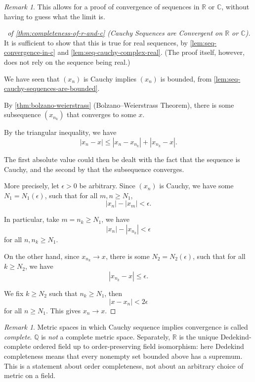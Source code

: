 \documentclass[11pt]{article}
\numberwithin{equation}{section}
\theoremstyle{definition}
\theoremstyle{remark}
\newtheorem{remark}[theorem]{Remark}
\newcommand{\pqty}[1]{\left(#1\right)}
\newcommand{\abs}[1]{\left|#1\right|}
\newcommand{\RR}{\mathbb R}
\newcommand{\CC}{\mathbb C}
\newcommand{\QQ}{\mathbb Q}
\begin{document}
\begin{remark}\label{analysis-unit-0028}
    This allows for a proof of convergence of sequences in \(\RR\) or \(\CC\), without having to guess what the limit is.
\end{remark}

\begin{proof}[\proofname\ of \autoref{thm:completeness-of-r-and-c} (Cauchy Sequences are Convergent on \(\RR\) or \(\CC\))]
    It is sufficient to show that this is true for real sequences, by \autoref{lem:seq-convergence-in-c} and \autoref{lem:seq-cauchy-complex-real}. (The proof itself, however, does not rely on the sequence being real.)

    We have seen that \(\pqty{x_n}\) is Cauchy implies \(\pqty{x_n}\) is bounded, from \autoref{lem:seq-cauchy-sequences-are-bounded}.
    
    By \autoref{thm:bolzano-weierstrass} (Bolzano--Weierstrass Theorem), there is some subsequence \(\pqty{x_{n_k}}\) that converges to some \(x\).

    By the triangular inequality, we have
    \[
        \abs{x_n - x} \leq \abs{x_n - x_{n_k}} + \abs{x_{n_k} - x}.
    \]

    The first absolute value could then be dealt with the fact that the sequence is Cauchy, and the second by that the subsequence converges.

    More precisely, let \(\epsilon > 0\) be arbitrary. Since \(\pqty{x_n}\) is Cauchy, we have some \(N_1 = N_1 \pqty{\epsilon}\), such that for all \(m, n \geq N_1\),
    \[
        \abs{x_n} - \abs{x_m} < \epsilon.
    \]

    In particular, take \(m = n_k \geq N_1\), we have
    \[
        \abs{x_n} - \abs{x_{n_k}} < \epsilon
    \]
    for all \(n, n_k \geq N_1\).

    On the other hand, since \(x_{n_k} \to x\), there is some \(N_2 = N_2 \pqty{\epsilon}\), such that for all \(k \geq N_2\), we have
    \[
        \abs{x_{n_k} - x} \leq \epsilon.
    \]

    We fix \(k \geq N_2\) such that \(n_k \geq N_1\), then
    \[
        \abs{x - x_n} < 2\epsilon
    \]
    for all \(n \geq N_1\). This gives \(x_n \to x\).
\end{proof}

\begin{remark}\label{analysis-unit-0029}
    Metric spaces in which Cauchy sequence implies convergence is called \emph{complete}. \(\QQ\) is \emph{not} a complete metric space. Separately, \(\mathbb R\) is the unique Dedekind-complete ordered field up to
order-preserving field isomorphism: here Dedekind completeness means that every
nonempty set bounded above has a supremum. This is a statement about order
completeness, not about an arbitrary choice of metric on a field.
\end{remark}
\end{document}
